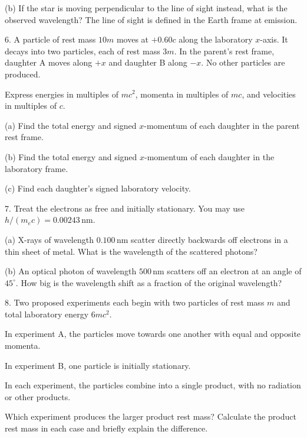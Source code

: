 \documentclass[12pt,letterpaper]{article}
\begin{document}
(b) If the star is moving perpendicular to the line of sight instead, what is the observed wavelength? The line of sight is defined in the Earth frame at emission.

\vfill
\newpage

6. A particle of rest mass $10m$ moves at $+0.60c$ along the laboratory $x$-axis. It decays into two particles, each of rest mass $3m$. In the parent's rest frame, daughter A moves along $+x$ and daughter B along $-x$. No other particles are produced.

Express energies in multiples of $mc^2$, momenta in multiples of $mc$, and velocities in multiples of $c$.

(a) Find the total energy and signed $x$-momentum of each daughter in the parent rest frame.

\vfill

(b) Find the total energy and signed $x$-momentum of each daughter in the laboratory frame.

\vfill

(c) Find each daughter's signed laboratory velocity.

\vfill
\newpage

7. Treat the electrons as free and initially stationary. You may use $h/(m_ec)=0.00243\,\mathrm{nm}$.

(a) X-rays of wavelength $0.100\,\mathrm{nm}$ scatter directly backwards off electrons in a thin sheet of metal. What is the wavelength of the scattered photons?

\vfill

(b) An optical photon of wavelength $500\,\mathrm{nm}$ scatters off an electron at an angle of $45^\circ$. How big is the wavelength shift as a fraction of the original wavelength?

\vfill
\newpage

8. Two proposed experiments each begin with two particles of rest mass $m$ and total laboratory energy $6mc^2$.

In experiment A, the particles move towards one another with equal and opposite momenta.

In experiment B, one particle is initially stationary.

In each experiment, the particles combine into a single product, with no radiation or other products.

Which experiment produces the larger product rest mass? Calculate the product rest mass in each case and briefly explain the difference.

\vfill
\end{document}
